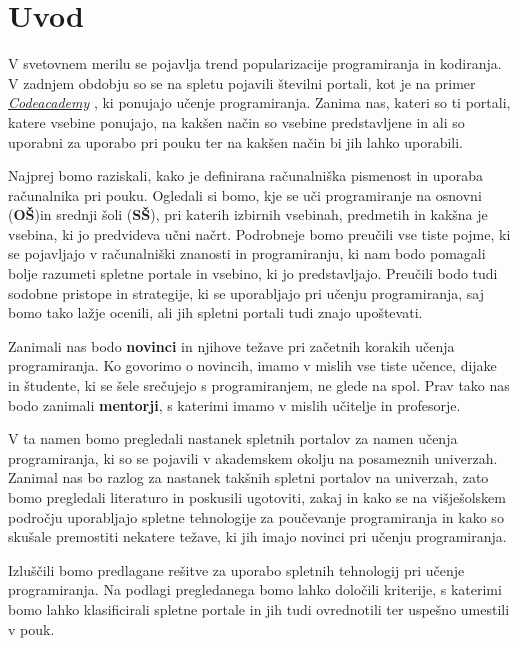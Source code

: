 \section{Uvod}
\label{sec:Uvod}


V svetovnem merilu se pojavlja trend popularizacije programiranja
in kodiranja. V zadnjem obdobju so se na spletu pojavili številni
portali, kot je na primer
\emph{\href{https://www.codecademy.com/}{Codeacademy}}
\cite{web:codeacademy}, ki ponujajo učenje programiranja. Zanima nas,
kateri so ti portali, katere vsebine ponujajo, na kakšen način so
vsebine predstavljene in ali so uporabni za uporabo pri pouku ter na
kakšen način bi jih lahko uporabili.

Najprej bomo raziskali, kako je definirana računalniška pismenost in
uporaba računalnika pri pouku. Ogledali si bomo, kje se uči
programiranje na osnovni (\textbf{OŠ})in srednji šoli
(\textbf{SŠ}), pri katerih izbirnih vsebinah, predmetih in kakšna je
vsebina, ki jo predvideva učni načrt. Podrobneje bomo preučili vse
tiste pojme, ki se pojavljajo v računalniški znanosti in
programiranju, ki nam bodo pomagali bolje razumeti spletne portale in
vsebino, ki jo predstavljajo. Preučili bodo tudi sodobne pristope in
strategije, ki se uporabljajo pri učenju programiranja, saj bomo tako
lažje ocenili, ali jih spletni portali tudi znajo upoštevati.

Zanimali nas bodo \textbf{novinci} in njihove težave pri začetnih
korakih učenja programiranja. Ko govorimo o novincih, imamo v mislih
vse tiste učence, dijake in študente, ki se šele srečujejo s
programiranjem, ne glede na spol. Prav tako nas bodo zanimali
\textbf{mentorji}, s katerimi imamo v mislih učitelje in profesorje.

V ta namen bomo pregledali nastanek spletnih portalov za namen učenja
programiranja, ki so se pojavili v akademskem okolju na posameznih
univerzah. Zanimal nas bo razlog za nastanek takšnih spletni portalov
na univerzah, zato bomo pregledali literaturo in poskusili ugotoviti,
zakaj in kako se na višješolskem področju uporabljajo spletne
tehnologije za poučevanje programiranja in kako so skušale premostiti
nekatere težave, ki jih imajo novinci pri učenju programiranja.

Izluščili bomo predlagane rešitve za uporabo spletnih tehnologij pri
učenje programiranja. Na podlagi pregledanega bomo lahko določili
kriterije, s katerimi bomo lahko klasificirali spletne portale in jih
tudi ovrednotili ter uspešno umestili v pouk.



